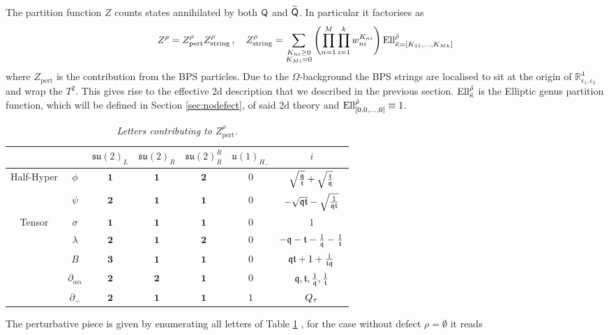 \documentclass[main.tex]{subfiles}
\begin{document}
The partition function $Z$ counts states annihilated by both $\mathsf{Q}$ and $\widetilde{\mathsf{Q}}$. In particular it factorises as
\begin{equation}\label{eqn:Zstringdef1}
Z^{\rho}=Z^{\rho}_{\text{pert}}Z^{\rho}_{\text{string}}\,,\quad Z^{\rho}_{\text{string}}=\sum_{\substack{K_{ni}\geq0\\K_{Mi}=0}}\left(\prod_{n=1}^M\prod_{i=1}^kw_{ni}^{K_{ni}}\right)\textrm{Ell}^{\tilde{\rho}}_{\tilde{\kappa}=[K_{11},\dots,K_{Mk}]}
\end{equation}
where $Z_{\text{pert}}$ is the contribution from the BPS particles. Due to the $\Omega$-background the BPS strings are localised to sit at the origin of $\mathbb{R}^4_{\epsilon_1,\epsilon_2}$ and wrap the $T^2$. This gives rise to the effective 2d description that we described in the previous section. $\textrm{Ell}^{\tilde{\rho}}_{\tilde{\kappa}}$ is the Elliptic genus partition function, which will be defined in Section \ref{sec:nodefect}, of said 2d theory and $\textrm{Ell}^{\tilde{\rho}}_{[0,0,\dots,0]}\equiv1$.
\begin{table}
\centering
 \begin{tabular}{|c|c|c|c|c|c|c|} 
 \hline
  & & $\mathfrak{su}(2)_L$ & $\mathfrak{su}(2)_R$& $\mathfrak{su}(2)_R^R$&$\mathfrak{u}(1)_{H_-}$&$i$\\\hline\hline
\multirow{2}{*}{Half-Hyper}&$\phi$ &$\mathbf{1}$ & $\mathbf{1}$&$\mathbf{2}$&$0$&$\sqrt{\frac{\mathfrak{q}}{\mathfrak{t}}}+\sqrt{\frac{\mathfrak{t}}{\mathfrak{q}}}$\\
&$\psi$ &$\mathbf{2}$ & $\mathbf{1}$&$\mathbf{1}$&$0$&$-\sqrt{\mathfrak{q}\mathfrak{t}}-\sqrt{\frac{1}{\mathfrak{q}\mathfrak{t}}}$\\\hline
\multirow{3}{*}{Tensor}&$\sigma$ &$\mathbf{1}$ & $\mathbf{1}$&$\mathbf{1}$&$0$&$1$\\
&$\lambda$ &$\mathbf{2}$ & $\mathbf{1}$&$\mathbf{2}$&$0$&$-\mathfrak{q}-\mathfrak{t}-\frac{1}{\mathfrak{q}}-\frac{1}{\mathfrak{t}}$\\
&$B$ &$\mathbf{3}$ & $\mathbf{1}$&$\mathbf{1}$&$0$&$\mathfrak{q}\mathfrak{t}+1+\frac{1}{\mathfrak{t}\mathfrak{q}}$\\\hline\hline
&$\partial_{\alpha\dot\alpha}$ &$\mathbf{2}$ & $\mathbf{2}$&$\mathbf{1}$&$0$&$\mathfrak{q},\mathfrak{t},\frac{1}{\mathfrak{q}},\frac{1}{\mathfrak{t}}$\\
&$\partial_{-}$ &$\mathbf{2}$ & $\mathbf{1}$&$\mathbf{1}$&$1$&$Q_{\tau}$\\\hline
\end{tabular}
\caption{\it Letters contributing to $Z^{\rho}_{\text{pert}}$.}\label{tab:6dletter}
\end{table}
The perturbative piece is given by enumerating all letters of Table \ref{tab:6dletter} \cite{Kim:2017xan,Kim:2015gha}, for the case without defect $\rho=\emptyset$ it reads
\end{document}
